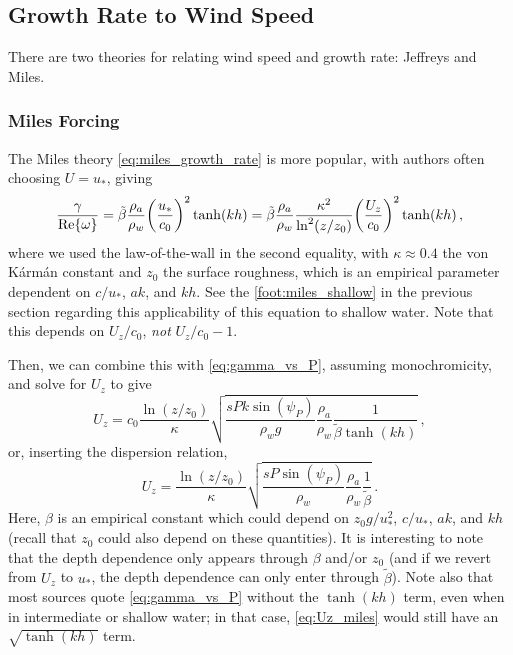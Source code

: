 \documentclass{jfm}
\let\Oldsubsection\subsection
\renewcommand{\subsection}{\FloatBarrier\Oldsubsection}
\let\Oldsubsubsection\subsubsection
\renewcommand{\subsubsection}{\FloatBarrier\Oldsubsubsection}
\begin{document}
\subsection{Growth Rate to Wind Speed}
There are two theories for relating wind speed and growth rate: Jeffreys
and Miles.

\subsubsection{Miles Forcing}
The Miles theory \cref{eq:miles_growth_rate} is more popular, with
authors often choosing $U = u_*$, giving
\begin{equation}
  \frac{\gamma}{\Re{\omega}}
  = \tilde{\beta} \frac{\rho_a}{\rho_w} \pqty{\frac{u_*}{c_0}}^2 \tanh(kh)
  = \tilde{\beta} \frac{\rho_a}{\rho_w} \frac{\kappa^2}{\ln^2(z/z_0)}
  \pqty{\frac{U_z}{c_0}}^2 \tanh(kh)
  \,,
\end{equation}
where we used the law-of-the-wall in the second equality,
with $\kappa \approx 0.4$ the von K\'{a}rm\'{a}n constant and $z_0$ the
surface roughness, which is an empirical parameter dependent on $c/u_*$,
$ak$, and $kh$.
See the \cref{foot:miles_shallow} in the previous section regarding this
applicability of this equation to shallow water.
Note that this depends on $U_z/c_0$, \emph{not} $U_z/c_0 -1$.

Then, we can combine this with \cref{eq:gamma_vs_P}, assuming
monochromicity, and solve for $U_z$ to give
\begin{equation}
  U_z = c_0 \frac{\ln(z/z_0)}{\kappa} \sqrt{
    \frac{s P k \sin(\psi_P)}{\rho_w g} \frac{\rho_a}{\rho_w}
    \frac{1}{\tilde{\beta} \tanh(kh)}} \,,
\end{equation}
or, inserting the dispersion relation,
\begin{equation}
  U_z = \frac{\ln(z/z_0)}{\kappa} \sqrt{
    \frac{s P \sin(\psi_P)}{\rho_w} \frac{\rho_a}{\rho_w}
    \frac{1}{\tilde{\beta}}}
    \,.
  \label{eq:Uz_miles}
\end{equation}
Here, $\beta$ is an empirical constant which could depend on $z_0
g/u_*^2$, $c/u_*$, $ak$, and $kh$ (recall that $z_0$ could also depend
on these quantities).
It is interesting to note that the depth dependence only appears through
$\beta$ and/or $z_0$ (and if we revert from $U_z$ to $u_*$, the depth
dependence can only enter through $\tilde{\beta}$).
Note also that most sources quote \cref{eq:gamma_vs_P} without the
$\tanh(kh)$ term, even when in intermediate or shallow water; in that
case, \cref{eq:Uz_miles} would still have an $\sqrt{\tanh(kh)}$ term.
\end{document}
